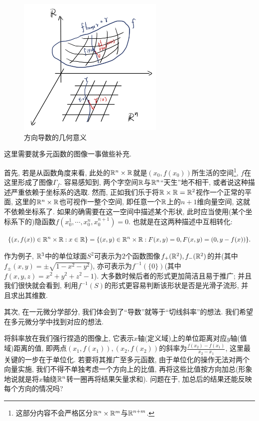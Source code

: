 \begin{figure}[H]
	\centering
	\includegraphics[width=7cm]{attachment/IMG_3923.jpg}
	\caption{方向导数的几何意义}
\end{figure}

这里需要就多元函数的图像一事做些补充. 

首先, 若是从函数角度来看, 此处的$\mathbb{R} ^n \times \mathbb{R}$就是$(x_0,f(x_0))$所生活的空间\footnote{这部分内容不会严格区分$\mathbb{R} ^n \times \mathbb{R} ^m$与$\mathbb{R} ^{n+m}$. }, $f$在这里形成了图像$\Gamma _f$. 容易感知到, 两个字空间$\mathbb{R}$与$\mathbb{R} ^n$“天生”地不相干, 或者说这种描述严重依赖于坐标系的选取. 然而, 正如我们乐于将$\mathbb{R} \times \mathbb{R} = \mathbb{R} ^2$视作一个正常的平面, 这里的$\mathbb{R} ^n \times \mathbb{R}$也可视作一整个空间, 即任意一个$\mathbb{R}$上的$n+1$维向量空间, 这就不依赖坐标系了. 如果的确需要在这一空间中描述某个形状, 此时应当使用(某个坐标系下的)隐函数$f(x_0^1,\cdots ,x_0^n,x_0^{n+1})=0$. 也就是在这两种描述中互相转化: 
\begin{center}
	$\displaystyle \{ (x,f(x)) \in \mathbb{R} ^n \times \mathbb{R} : x \in \mathbb{R} \} = \{ (x,y) \in \mathbb{R} ^n \times \mathbb{R} : F(x,y)=0,F(x,y)=(0,y-f(x)) \}.$
\end{center}
作为例子, $\mathbb{R} ^3$中的单位球面$S^2$可表示为$2$个函数图像$f_+(\mathbb{R} ^2),f_-(\mathbb{R} ^2)$的并(其中$f_{\pm} (x,y)= \pm \sqrt{1-x^2-y^2}$), 亦可表示为$f^{-1}(\{ 0 \})$(其中$f(x,y,z) = x^2+y^2+z^2-1$). 大多数时候后者的形式更加简洁且易于推广; 并且我们很快就会看到, 利用$f^{-1}(S)$的形式更容易判断该形状是否是光滑子流形, 并且求出其维数. 

其次, 在一元微分学部分, 我们体会到了“导数”就等于“切线斜率”的想法. 我们希望在多元微分学中找到对应的想法. 

将斜率放在我们强行捏造的图像上, 它表示$x$轴(定义域)上的单位距离对应$y$轴(值域)距离的值, 即两点$(x_1,f(x_1)),(x_2,f(x_2))$的斜率为$\frac{f(x_2)-f(x_1)}{x_2-x_1}$, 这里最关键的一步在于单位化. 若要将其推广至多元函数, 由于单位化的操作无法对两个向量实施, 我们不得不单独考虑一个方向上的比值, 再将这些比值按方向加总(形象地说就是将$x$轴绕$\mathbb{R} ^n$转一圈再将结果矢量求和). 问题在于, 加总后的结果还能反映每个方向的情况吗? 


